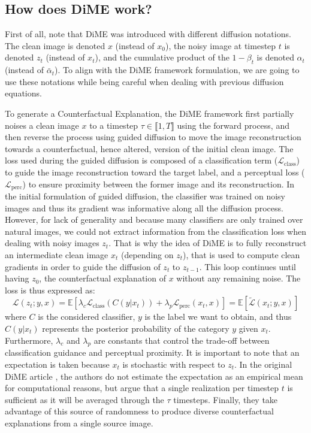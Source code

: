 \documentclass[11pt]{article}
\begin{document}
\subsection{How does DiME work?}

First of all, note that DiME was introduced with different diffusion
notations. The clean image is denoted $x$ (instead of $x_0$), the
noisy image at timestep $t$ is denoted $z_t$ (instead of $x_t$), and
the cumulative product of the $1-\beta_t$ is denoted $\alpha_t$
(instead of $\bar{\alpha}_t$). To align with the DiME framework
formulation, we are going to use these notations while being careful
when dealing with previous diffusion equations.

To generate a Counterfactual Explanation, the DiME framework first
partially noises a clean image $x$ to a timestep $\tau\in\llbracket
1, T \rrbracket$ using the forward process, and then reverse the
process using guided diffusion to move the image reconstruction
towards a counterfactual, hence altered, version of the initial clean
image. The loss used during the guided diffusion is composed of a
classification term ($\mathcal{L}_\text{class}$) to guide the image
reconstruction toward the target label, and a perceptual loss
($\mathcal{L}_\text{perc}$) to ensure proximity between the former
image and its reconstruction. In the initial formulation of guided
diffusion, the classifier was trained on noisy images and thus its
gradient was informative along all the diffusion process. However,
for lack of generality and because many classifiers are only trained
over natural images, we could not extract information from the
classification loss when dealing with noisy images $z_t$. That is why
the idea of DiME is to fully reconstruct an intermediate clean image
$x_t$ (depending on $z_t$), that is used to compute clean gradients
in order to guide the diffusion of $z_t$ to $z_{t-1}$. This loop
continues until having $z_0$, the counterfactual explanation of $x$
without any remaining noise. The loss is thus expressed as:
$$
\mathcal{L}(z_t;y,x) = \mathbb{E}\left[ \lambda_c
  \mathcal{L}_\text{class}(C(y|x_t)) + \lambda_p
\mathcal{L}_\text{perc}(x_t,x) \right] = \mathbb{E}\left[
\tilde{\mathcal{L}}(x_t;y,x) \right]
$$
where $C$ is the considered classifier, $y$ is the label we want to
obtain, and thus $C(y|x_t)$ represents the posterior probability of
the category $y$ given $x_t$. Furthermore, $\lambda_c$ and
$\lambda_p$ are constants that control the trade-off between
classification guidance and perceptual proximity. It is important to
note that an expectation is taken because $x_t$ is stochastic with
respect to $z_t$. In the original DiME article
\cite{jeanneret2022diffusion}, the authors do not estimate the
expectation as an empirical mean for computational reasons, but argue
that a single realization per timestep $t$ is sufficient as it will
be averaged through the $\tau$ timesteps. Finally, they take
advantage of this source of randomness to produce diverse
counterfactual explanations from a single source image.
\end{document}
